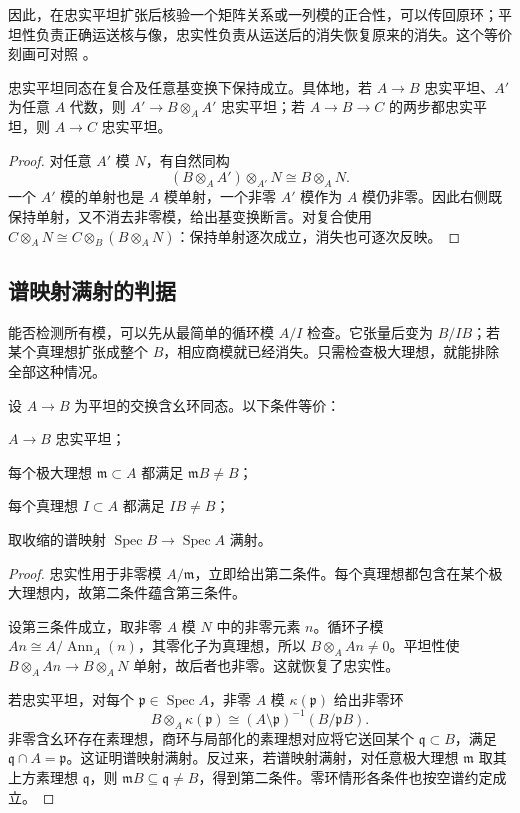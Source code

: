 因此，在忠实平坦扩张后核验一个矩阵关系或一列模的正合性，可以传回原环；平坦性负责正确运送核与像，忠实性负责从运送后的消失恢复原来的消失。这个等价刻画可对照 \cite[第7节，定理7.2，第47页]{Matsumura1989}。

\begin{proposition}\label{g5:prop:faithful-flat-base-change}
	忠实平坦同态在复合及任意基变换下保持成立。具体地，若 \(A\to B\) 忠实平坦、\(A'\) 为任意 \(A\) 代数，则 \(A'\to B\otimes_A A'\) 忠实平坦；若 \(A\to B\to C\) 的两步都忠实平坦，则 \(A\to C\) 忠实平坦。
\end{proposition}
\begin{proof}
	对任意 \(A'\) 模 \(N\)，有自然同构
	\[
		(B\otimes_A A')\otimes_{A'}N\cong B\otimes_A N.
	\]
	一个 \(A'\) 模的单射也是 \(A\) 模单射，一个非零 \(A'\) 模作为 \(A\) 模仍非零。因此右侧既保持单射，又不消去非零模，给出基变换断言。对复合使用
	\(C\otimes_A N\cong C\otimes_B(B\otimes_A N)\)：保持单射逐次成立，消失也可逐次反映。
\end{proof}

\subsection{谱映射满射的判据}
\label{g5:subsec:0604:02}

能否检测所有模，可以先从最简单的循环模 \(A/I\) 检查。它张量后变为 \(B/IB\)；若某个真理想扩张成整个 \(B\)，相应商模就已经消失。只需检查极大理想，就能排除全部这种情况。

\begin{theorem}\label{g5:thm:faithful-flat-spectrum}
	设 \(A\to B\) 为平坦的交换含幺环同态。以下条件等价：
	\begin{equivalences}
		\item \(A\to B\) 忠实平坦；
		\item 每个极大理想 \(\mathfrak m\subset A\) 都满足 \(\mathfrak mB\ne B\)；
		\item 每个真理想 \(I\subset A\) 都满足 \(IB\ne B\)；
		\item 取收缩的谱映射 \(\operatorname{Spec}B\to\operatorname{Spec}A\) 满射。
	\end{equivalences}
\end{theorem}
\begin{proof}
	忠实性用于非零模 \(A/\mathfrak m\)，立即给出第二条件。每个真理想都包含在某个极大理想内，故第二条件蕴含第三条件。

	设第三条件成立，取非零 \(A\) 模 \(N\) 中的非零元素 \(n\)。循环子模
	\(An\cong A/\operatorname{Ann}_A(n)\)，其零化子为真理想，所以
	\(B\otimes_A An\ne0\)。平坦性使 \(B\otimes_A An\to B\otimes_A N\) 单射，故后者也非零。这就恢复了忠实性。

	若忠实平坦，对每个 \(\mathfrak p\in\operatorname{Spec}A\)，非零 \(A\) 模 \(\kappa(\mathfrak p)\) 给出非零环
	\[
		B\otimes_A\kappa(\mathfrak p)
		\cong (A\setminus\mathfrak p)^{-1}(B/\mathfrak pB).
	\]
	非零含幺环存在素理想，商环与局部化的素理想对应将它送回某个 \(\mathfrak q\subset B\)，满足 \(\mathfrak q\cap A=\mathfrak p\)。这证明谱映射满射。反过来，若谱映射满射，对任意极大理想 \(\mathfrak m\) 取其上方素理想 \(\mathfrak q\)，则 \(\mathfrak mB\subseteq\mathfrak q\ne B\)，得到第二条件。零环情形各条件也按空谱约定成立。
\end{proof}


